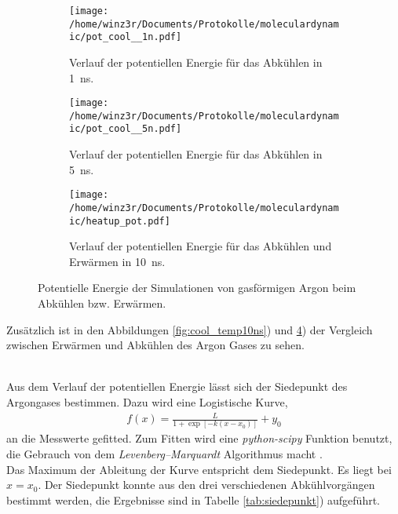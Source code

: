 \begin{figure}
  \centering
  \vspace{-0.3cm}
  \begin{subfigure}[h]{0.45\textwidth}
    \centering
    \texttt{[image: /home/winz3r/Documents/Protokolle/moleculardynamic/pot\_cool\_\_1n.pdf]}
    \caption{\centering Verlauf der potentiellen Energie für das Abkühlen in 1~ns.}\label{fig:cool_pot1ns}
  \end{subfigure}
  \vspace{0.25cm}
  \centering
  \begin{subfigure}[h]{0.45\textwidth}
    \centering
    \texttt{[image: /home/winz3r/Documents/Protokolle/moleculardynamic/pot\_cool\_\_5n.pdf]}
    \caption{\centering Verlauf der potentiellen Energie für das Abkühlen in 5~ns.}\label{fig:cool_pot5ns}
  \end{subfigure}
  \vspace{0.25cm}
  \centering
  \begin{subfigure}{\textwidth}
    \centering
    \texttt{[image: /home/winz3r/Documents/Protokolle/moleculardynamic/heatup\_pot.pdf]}
    \caption{Verlauf der potentiellen Energie für das Abkühlen und Erwärmen in 10~ns.}\label{fig:cool_pot10ns}
  \end{subfigure}
  \caption{Potentielle Energie der Simulationen von gasförmigen Argon beim Abkühlen bzw. Erwärmen.}
\end{figure}
Zusätzlich ist in den Abbildungen \ref{fig:cool_temp10ns}) und \ref{fig:cool_pot10ns}) der Vergleich zwischen Erwärmen und Abkühlen des Argon Gases zu sehen.

\\ \noindent
Aus dem Verlauf der potentiellen Energie lässt sich der Siedepunkt des Argongases bestimmen. Dazu wird eine Logistische Kurve,
\begin{align}
f(x)=\frac{L}{1+\exp\left[ -k \left(x-x_0\right)\right]} + y_0
\end{align}
an die Messwerte gefitted.
Zum Fitten wird eine \emph{python-scipy} Funktion benutzt, die Gebrauch von dem \emph{Levenberg–Marquardt} Algorithmus macht \cite{leastsquares}.
\\ \noindent
Das Maximum der Ableitung der Kurve entspricht dem Siedepunkt. Es liegt bei $x = x_0$.
Der Siedepunkt konnte aus den drei verschiedenen Abkühlvorgängen bestimmt werden, die Ergebnisse sind in Tabelle \ref{tab:siedepunkt}) aufgeführt.

